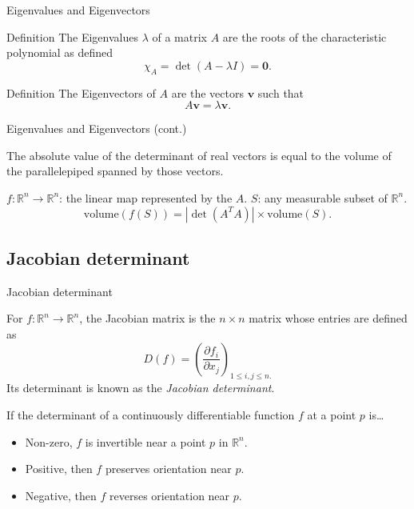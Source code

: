 \documentclass{beamer}
\begin{document}
\begin{frame}{Eigenvalues and Eigenvectors}

    \begin{block}{Definition}
        The Eigenvalues $\lambda$ of a matrix $A$ are the roots of the characteristic polynomial
        as defined
        \[
            \chi_A = \det(A - \lambda I) = \mathbf{0}.
        \]
    \end{block}

    \pause{}

    \begin{block}{Definition}
        The Eigenvectors of $A$ are the vectors $\mathbf{v}$ such that
        \[
            A\mathbf{v} = \lambda \mathbf{v}.
        \]
    \end{block}

\end{frame}

\begin{frame}{Eigenvalues and Eigenvectors (cont.)}

    The absolute value of the determinant of real vectors is equal to the volume
    of the parallelepiped spanned by those vectors.

    $f : \mathbb{R}^n \to \mathbb{R}^n$: the linear map represented by the $A$.
    $S$: any measurable subset of $\mathbb{R}^n$.
    \[
        \text{volume}(f(S)) = |\det{({A^T}A)}| \times \text{volume}(S).
    \]


\end{frame}

\subsection{Jacobian determinant}

\begin{frame}{Jacobian determinant}

    For $f : \mathbb{R}^n \to \mathbb{R}^n$,
    the Jacobian matrix is the $n \times n$ matrix whose entries are defined as
    \[
        D(f) = {\left( \frac{\partial f_i}{\partial x_j} \right)}_{1 \leq i, j \leq n.}
    \]
    Its determinant is known as the \emph{Jacobian determinant}.


    \begin{exampleblock}{}
        If the determinant of a continuously differentiable function $f$ at a point $p$ is\dots
        \begin{itemize}
            \item Non-zero, $f$ is invertible near a point $p$ in $\mathbb{R}^n$.
            \item Positive, then $f$ preserves orientation near $p$.
            \item Negative, then $f$ reverses orientation near $p$.
        \end{itemize}
    \end{exampleblock}

\end{frame}
\end{document}

